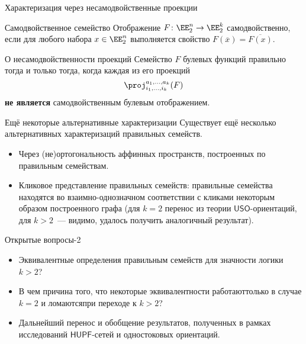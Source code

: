 \begin{frame}{Характеризация через несамодвойственные проекции}
    \begin{block}{Самодвойственное семейство}
        Отображение $F \colon \EE_2^n \to \EE_2^k$ самодвойственно, если для любого набора $x \in \EE_2^n$ выполняется свойство $F(\overline{x}) = \overline{F(x)}$.
    \end{block}
    \pause 
    \begin{alertblock}{О несамодвойственности проекций} 
        Семейство $F$ булевых функций правильно тогда и только тогда, когда каждая из его проекций 
        \[
            \proj^{a_1, \ldots, a_k}_{i_1, \ldots, i_k}(F)
        \] 
        \textbf{не является} самодвойственным булевым отображением.
    \end{alertblock}
\end{frame}


\begin{frame}{Ещё некоторые альтернативные характеризации}
    Существует ещё несколько альтернативных характеризаций правильных семейств.
    \begin{itemize}
        \item Через (не)ортогональность аффинных пространств, построенных по правильным семействам.
        \pause
        \item Кликовое представление правильных семейств: правильные семейства находятся во взаимно-однозначном соответствии с кликами некоторым образом построенного графа (для $k=2$ перенос из теории $\mathsf{USO}$-ориентаций, для $k > 2$~--- видимо, удалось получить аналогичный результат).
    \end{itemize}
\end{frame}


\begin{frame}{Открытые вопросы-2}
    \begin{itemize}
        \item Эквивалентные определения правильным семейств для значности логики $k > 2$?
        \pause 
        \item В чем причина того, что некоторые эквивалентности  \guillemotleft работают\guillemotright только в случае $k = 2$ и  \guillemotleft ломаются\guillemotright при переходе к $k > 2$?
        \pause 
        \item Дальнейший перенос и обобщение результатов, полученных в рамках исследований $\mathsf{HUPF}$-сетей и одностоковых ориентаций.
    \end{itemize}
\end{frame}


